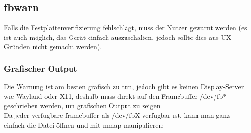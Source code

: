 \subsection{fbwarn}
Falls die Festplattenverifizierung fehlschlägt, muss der Nutzer gewarnt werden (es ist auch möglich, das Gerät einfach auszuschalten, jedoch sollte dies aus UX Gründen nicht gemacht werden).

\subsubsection{Grafischer Output}
Die Warnung ist am besten grafisch zu tun, jedoch gibt es keinen Display-Server wie Wayland oder X11, deshalb muss direkt auf den Framebuffer /dev/fb* geschrieben werden, um grafischen Output zu zeigen.\\
Da jeder verfügbare framebuffer als /dev/fbX verfügbar ist, kann man ganz einfach die Datei öffnen und mit mmap manipulieren:

